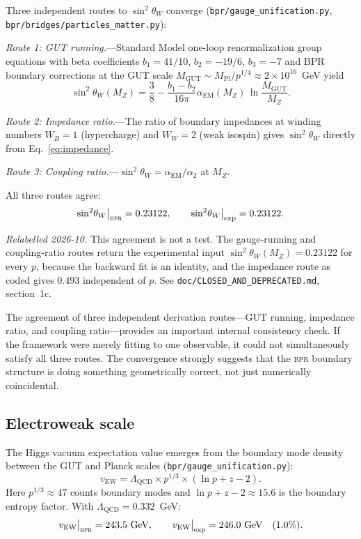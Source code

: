 \documentclass[aps,prd,twocolumn,superscriptaddress,longbibliography,nofootinbib]{revtex4-2}
\newcommand{\vEW}{v_{\mathrm{EW}}}
\newcommand{\sinW}{\sin^2\!\theta_W}
\newcommand{\alphaEM}{\alpha_{\mathrm{EM}}}
\newcommand{\LQCD}{\Lambda_{\mathrm{QCD}}}
\newcommand{\MPl}{M_{\mathrm{Pl}}}
\newcommand{\MGUT}{M_{\mathrm{GUT}}}
\newcommand{\MZ}{M_Z}
\newcommand{\bpr}{\textsc{bpr}}
\begin{document}
Three independent routes to $\sinW$ converge
(\texttt{bpr/gauge\_unification.py},
\texttt{bpr/bridges/particles\_matter.py}):

\textit{Route 1: GUT running.}---Standard Model one-loop
renormalization group equations with beta coefficients
$b_1 = 41/10$, $b_2 = -19/6$, $b_3 = -7$ and BPR boundary
corrections at the GUT scale $\MGUT \sim \MPl / p^{1/4} \approx
2 \times 10^{16}$~GeV yield
\begin{equation}
\sinW(\MZ) = \frac{3}{8} - \frac{b_1 - b_2}{16\pi}
  \alphaEM(\MZ)\, \ln\frac{\MGUT}{\MZ}.
\label{eq:weinberg_running}
\end{equation}

\textit{Route 2: Impedance ratio.}---The ratio of boundary
impedances at winding numbers $W_B = 1$ (hypercharge) and $W_W = 2$
(weak isospin) gives $\sinW$ directly from
Eq.~\eqref{eq:impedance}.

\textit{Route 3: Coupling ratio.}---$\sinW =
\alphaEM / \alpha_2$ at $\MZ$.

All three routes agree:
\begin{equation}
\sinW\big|_{\bpr} = 0.23122, \qquad
\sinW\big|_{\mathrm{exp}} = 0.23122.
\label{eq:weinberg_value}
\end{equation}

\textit{Relabelled 2026-10.}  This agreement is not a test.  The
gauge-running and coupling-ratio routes return the experimental input
$\sinW(\MZ) = 0.23122$ for every $p$, because the backward fit is an
identity, and the impedance route as coded gives $0.493$ independent of
$p$.  See \texttt{doc/CLOSED\_AND\_DEPRECATED.md}, section~1c.

The agreement of three independent derivation routes---GUT running,
impedance ratio, and coupling ratio---provides an important
internal consistency check.  If the framework were merely fitting to
one observable, it could not simultaneously satisfy all three
routes.  The convergence strongly suggests that the \bpr{} boundary
structure is doing something geometrically correct, not just
numerically coincidental.

\subsection{Electroweak scale}

The Higgs vacuum expectation value emerges from the boundary mode
density between the GUT and Planck scales
(\texttt{bpr/gauge\_unification.py}):
\begin{equation}
\vEW = \LQCD \times p^{1/3} \times (\ln p + z - 2).
\label{eq:vew}
\end{equation}
Here $p^{1/3} \approx 47$ counts boundary modes and
$\ln p + z - 2 \approx 15.6$ is the boundary entropy factor.  With
$\LQCD = 0.332$~GeV:
\begin{equation}
\vEW\big|_{\bpr} = 243.5~\text{GeV}, \qquad
\vEW\big|_{\mathrm{exp}} = 246.0~\text{GeV} \quad (1.0\%).
\label{eq:vew_value}
\end{equation}
\end{document}
